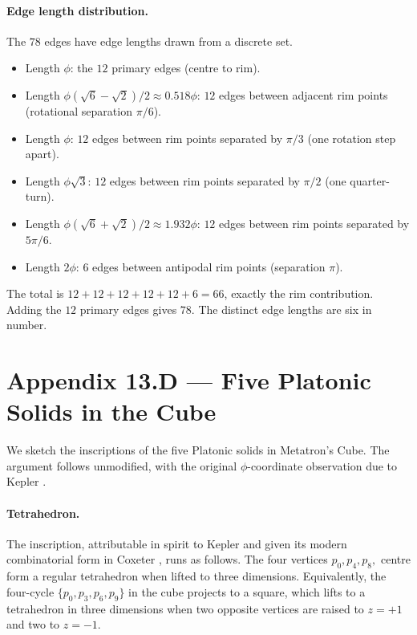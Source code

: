 \paragraph{Edge length distribution.}
The $78$ edges have edge lengths drawn from a discrete set.
\begin{itemize}
\item Length $\phi$: the $12$ primary edges (centre to rim).
\item Length $\phi(\sqrt{6} - \sqrt{2})/2 \approx 0.518\phi$: $12$
  edges between adjacent rim points (rotational separation
  $\pi/6$).
\item Length $\phi$: $12$ edges between rim points separated by
  $\pi/3$ (one rotation step apart).
\item Length $\phi\sqrt{3}$: $12$ edges between rim points
  separated by $\pi/2$ (one quarter-turn).
\item Length $\phi(\sqrt{6} + \sqrt{2})/2 \approx 1.932\phi$: $12$
  edges between rim points separated by $5\pi/6$.
\item Length $2\phi$: $6$ edges between antipodal rim points
  (separation $\pi$).
\end{itemize}

The total is $12 + 12 + 12 + 12 + 12 + 6 = 66$, exactly the rim
contribution. Adding the $12$ primary edges gives $78$. The
distinct edge lengths are six in number.

\section*{Appendix 13.D --- Five Platonic Solids in the Cube}
\label{sec:13-appD}

We sketch the inscriptions of the five Platonic solids in
Metatron's Cube. The argument follows \cite{coxeter1973regular}
unmodified, with the original $\phi$-coordinate observation due to
Kepler \cite{kepler_harmonices}.

\paragraph{Tetrahedron.}
The inscription, attributable in spirit to Kepler
\cite{kepler_harmonices} and given its modern combinatorial form
in Coxeter \cite{coxeter1973regular}, runs as follows. The four
vertices $p_{0}, p_{4}, p_{8}, $ centre form a regular
tetrahedron when lifted to three dimensions. Equivalently, the
four-cycle $\{p_{0}, p_{3}, p_{6}, p_{9}\}$ in the cube projects to
a square, which lifts to a tetrahedron in three dimensions when
two opposite vertices are raised to $z = +1$ and two to $z = -1$.

